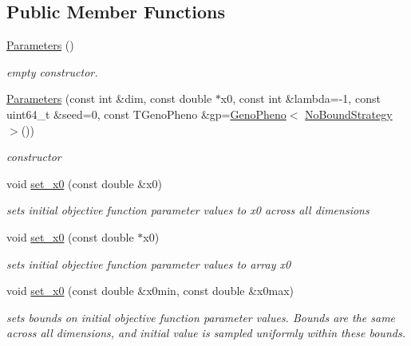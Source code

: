 \subsection*{Public Member Functions}
\begin{DoxyCompactItemize}
\item 
\hypertarget{classlibcmaes_1_1Parameters_a680f96c102aa0cb4c9e8d39b515392b9}{\hyperlink{classlibcmaes_1_1Parameters_a680f96c102aa0cb4c9e8d39b515392b9}{Parameters} ()}\label{classlibcmaes_1_1Parameters_a680f96c102aa0cb4c9e8d39b515392b9}

\begin{DoxyCompactList}\small\item\em empty constructor. \end{DoxyCompactList}\item 
\hyperlink{classlibcmaes_1_1Parameters_a082cedda8396793496e8d796bc0184b2}{Parameters} (const int \&dim, const double $\ast$x0, const int \&lambda=-\/1, const uint64\-\_\-t \&seed=0, const T\-Geno\-Pheno \&gp=\hyperlink{classlibcmaes_1_1GenoPheno}{Geno\-Pheno}$<$ \hyperlink{classlibcmaes_1_1NoBoundStrategy}{No\-Bound\-Strategy} $>$())
\begin{DoxyCompactList}\small\item\em constructor \end{DoxyCompactList}\item 
void \hyperlink{classlibcmaes_1_1Parameters_a61660152146a78000b5cc59a0298a8f0}{set\-\_\-x0} (const double \&x0)
\begin{DoxyCompactList}\small\item\em sets initial objective function parameter values to x0 across all dimensions \end{DoxyCompactList}\item 
void \hyperlink{classlibcmaes_1_1Parameters_a50056ec90bc1b89295f8363eb566b8ce}{set\-\_\-x0} (const double $\ast$x0)
\begin{DoxyCompactList}\small\item\em sets initial objective function parameter values to array x0 \end{DoxyCompactList}\item 
void \hyperlink{classlibcmaes_1_1Parameters_a2db4deff995719566b86bfc0c2df4e91}{set\-\_\-x0} (const double \&x0min, const double \&x0max)
\begin{DoxyCompactList}\small\item\em sets bounds on initial objective function parameter values. Bounds are the same across all dimensions, and initial value is sampled uniformly within these bounds. \end{DoxyCompactList}\item 

\end{DoxyCompactItemize}
